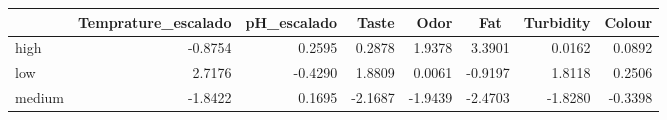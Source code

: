 \begin{tabular}{lrrrrrrr}
\toprule
 & Temprature\_escalado & pH\_escalado & Taste & Odor & Fat\  & Turbidity & Colour \\
\midrule
high & -0.8754 & 0.2595 & 0.2878 & 1.9378 & 3.3901 & 0.0162 & 0.0892 \\
low & 2.7176 & -0.4290 & 1.8809 & 0.0061 & -0.9197 & 1.8118 & 0.2506 \\
medium & -1.8422 & 0.1695 & -2.1687 & -1.9439 & -2.4703 & -1.8280 & -0.3398 \\
\bottomrule
\end{tabular}